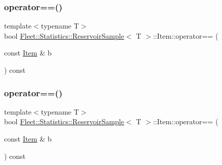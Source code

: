\subsubsection{\texorpdfstring{operator==()}{operator==()}\hspace{0.1cm}{\footnotesize\ttfamily [1/2]}}
{\footnotesize\ttfamily template$<$typename T$>$ \\
bool \hyperlink{class_fleet_1_1_statistics_1_1_reservoir_sample}{Fleet\+::\+Statistics\+::\+Reservoir\+Sample}$<$ T $>$\+::Item\+::operator== (\begin{DoxyParamCaption}\item[{const \hyperlink{class_fleet_1_1_statistics_1_1_reservoir_sample_1_1_item}{Item} \&}]{b }\end{DoxyParamCaption}) const\hspace{0.3cm}{\ttfamily [inline]}}

\mbox{\label{class_fleet_1_1_statistics_1_1_reservoir_sample_1_1_item_ab3adc1f593aec74d7d140f8c3553546e}} 
\subsubsection{\texorpdfstring{operator==()}{operator==()}\hspace{0.1cm}{\footnotesize\ttfamily [2/2]}}
{\footnotesize\ttfamily template$<$typename T$>$ \\
bool \hyperlink{class_fleet_1_1_statistics_1_1_reservoir_sample}{Fleet\+::\+Statistics\+::\+Reservoir\+Sample}$<$ T $>$\+::Item\+::operator== (\begin{DoxyParamCaption}\item[{const \hyperlink{class_fleet_1_1_statistics_1_1_reservoir_sample_1_1_item}{Item} \&}]{b }\end{DoxyParamCaption}) const\hspace{0.3cm}{\ttfamily [inline]}}

\mbox{\label{class_fleet_1_1_statistics_1_1_reservoir_sample_1_1_item_a9cbecacee3b118d645d3f9a42782382b}} 
